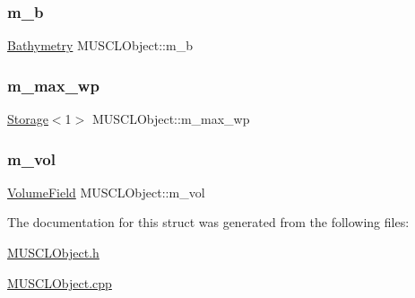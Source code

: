 \subsubsection{\texorpdfstring{m\+\_\+b}{m\_b}}
{\footnotesize\ttfamily \hyperlink{structBathymetry}{Bathymetry} M\+U\+S\+C\+L\+Object\+::m\+\_\+b\hspace{0.3cm}{\ttfamily [protected]}}

\mbox{\label{structMUSCLObject_a51fb4420efee42e415b49bca63d40742}} 
\subsubsection{\texorpdfstring{m\+\_\+max\+\_\+wp}{m\_max\_wp}}
{\footnotesize\ttfamily \hyperlink{Includes_8h_ae7d375db701e28425a3faea2827f134b}{Storage}$<$1$>$ M\+U\+S\+C\+L\+Object\+::m\+\_\+max\+\_\+wp\hspace{0.3cm}{\ttfamily [protected]}}

\mbox{\label{structMUSCLObject_ab01f05c398ad6379881a5c75401c85e1}} 
\subsubsection{\texorpdfstring{m\+\_\+vol}{m\_vol}}
{\footnotesize\ttfamily \hyperlink{ValueField_8h_a329043a10c46a8722ea79ba24fe40f97}{Volume\+Field} M\+U\+S\+C\+L\+Object\+::m\+\_\+vol\hspace{0.3cm}{\ttfamily [protected]}}



The documentation for this struct was generated from the following files\+:\begin{DoxyCompactItemize}
\item 
\hyperlink{MUSCLObject_8h}{M\+U\+S\+C\+L\+Object.\+h}\item 
\hyperlink{MUSCLObject_8cpp}{M\+U\+S\+C\+L\+Object.\+cpp}\end{DoxyCompactItemize}
